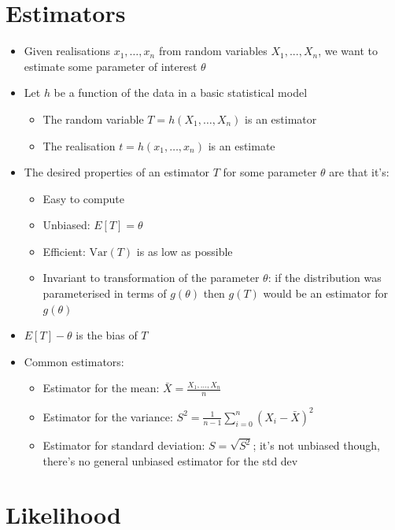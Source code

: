 \documentclass{article}
\begin{document}
\section{Estimators}

\begin{itemize}
    \item Given realisations $x_1,\dots,x_n$ from random variables $X_1,...,X_n$, we want to estimate some parameter of interest $\theta$
    \item Let $h$ be a function of the data in a basic statistical model
    \begin{itemize}
        \item The random variable $T=h(X_1,\dots,X_n)$ is an estimator
        \item The realisation $t=h(x_1,\dots,x_n)$ is an estimate
    \end{itemize}
    \item The desired properties of an estimator $T$ for some parameter $\theta$ are that it's:
    \begin{itemize}
        \item Easy to compute
        \item Unbiased: $E[T]=\theta$
        \item Efficient: $\text{Var}(T)$ is as low as possible
        \item Invariant to transformation of the parameter $\theta$: if the distribution was parameterised in terms of $g(\theta)$ then $g(T)$ would be an estimator for $g(\theta)$
    \end{itemize}
    \item $E[T]-\theta$ is the bias of $T$
    \item Common estimators:
    \begin{itemize}
        \item Estimator for the mean: $\bar{X}=\frac{X_1,\dots,X_n}{n}$
        \item Estimator for the variance: $S^2=\frac{1}{n-1}\sum_{i=0}^{n}(X_i-\bar{X})^2$
        \item Estimator for standard deviation: $S=\sqrt{S^2}$; it's not unbiased though, there's no general unbiased estimator for the std dev
    \end{itemize}
\end{itemize}

\section{Likelihood}
\end{document}
